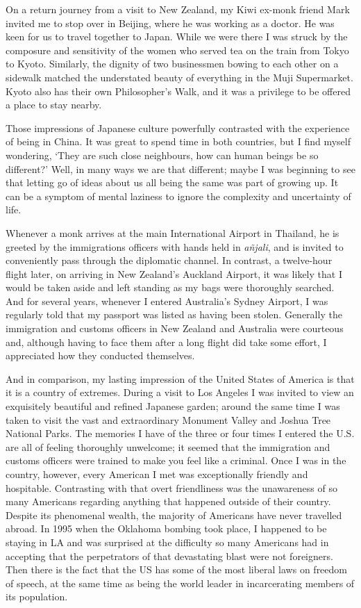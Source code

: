 On a return journey from a visit to New Zealand, my Kiwi ex-monk friend
Mark invited me to stop over in Beijing, where he was working as a
doctor. He was keen for us to travel together to Japan. While we were
there I was struck by the composure and sensitivity of the women who
served tea on the train from Tokyo to Kyoto. Similarly, the dignity of
two businessmen bowing to each other on a sidewalk matched the
understated beauty of everything in the Muji Supermarket. Kyoto also has
their own Philosopher's Walk\cite{walk}, and it was a privilege to be
offered a place to stay nearby.

Those impressions of Japanese culture powerfully contrasted with the
experience of being in China.
It was great to spend time in both countries, but I find myself wondering, `They
are such close neighbours, how can human beings be so different?'
Well, in many ways
we are that different; maybe I was beginning to see that letting go of
ideas about us all being the same was part of growing up. It can be a
symptom of mental laziness to ignore the complexity and uncertainty of
life.

Whenever a monk arrives at the main International Airport in Thailand,
he is greeted by the immigrations officers with hands held in
\emph{añjali}, and is invited to conveniently pass through the
diplomatic channel. In contrast, a twelve-hour flight later, on arriving
in New Zealand's Auckland Airport, it was likely that I would be taken
aside and left standing as my bags were thoroughly searched. And for
several years, whenever I entered Australia's Sydney Airport, I was
regularly told that my passport was listed as having been stolen.
Generally the immigration and customs officers in New Zealand and
Australia were courteous and, although having to face them after a long
flight did take some effort, I appreciated how they conducted
themselves.

And in comparison, my lasting impression of the United States of America
is that it is a country of extremes. During a visit to Los Angeles I was
invited to view an exquisitely beautiful and refined Japanese garden;
around the same time I was taken to visit the vast and extraordinary
Monument Valley\cite{monument} and Joshua Tree\cite{joshua}
National Parks. The memories I have of the three or
four times I entered the U.S. are all of feeling thoroughly unwelcome;
it seemed that the immigration and customs officers were trained to make
you feel like a criminal. Once I was in the country, however, every
American I met was exceptionally friendly and hospitable. Contrasting
with that overt friendliness was the unawareness of so many Americans
regarding anything that happened outside of their country. Despite its
phenomenal wealth, the majority of Americans have never travelled
abroad. In 1995 when the Oklahoma bombing\cite{oklahoma}
took place, I happened to be staying in LA and was
surprised at the difficulty so many Americans had in accepting that the
perpetrators of that devastating blast were not foreigners. Then there
is the fact that the US has some of the most liberal laws on freedom of
speech, at the same time as being the
world leader in incarcerating\cite{incarceration} members of its population.

